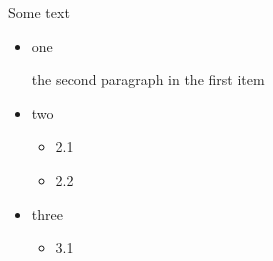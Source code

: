 Some text
\begin{itemize}
  \item one

        the second paragraph in the first item
  \item two
        \begin{itemize}
          \item 2.1
          \item 2.2
        \end{itemize}
  \item three
        \begin{itemize}
          \item 3.1
        \end{itemize}
\end{itemize}
